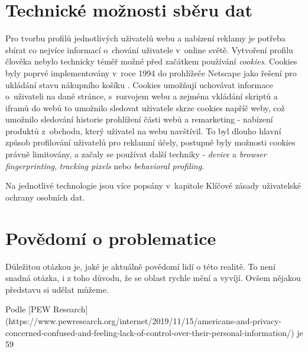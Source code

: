 
\section{Technické možnosti sběru dat}

Pro tvorbu profilů jednotlivých uživatelů webu a nabízení reklamy je potřeba sbírat co nejvíce informací o~chování uživatele v~online světě. Vytvoření profilu člověka nebylo technicky téměř možné před začátkem používání \textit{cookies}.
Cookies byly poprvé implementovány v~roce 1994 do prohlížeče Netscape jako řešení pro ukládání stavu nákupního košíku \citep{cookies-history}. Cookies umožňují uchovávat informace o~uživateli na dané stránce, s~rozvojem webu a zejména vkládání skriptů a iframů do webů to umožnilo sledovat uživatele skrze cookies napříč weby, což umožnilo sledování historie prohlížení části webů a remarketing - nabízení produktů z~obchodu, který uživatel na webu navštívil\citep{scott-cookies}. To byl dlouho hlavní způsob profilování uživatelů pro reklamní účely, postupně byly možnosti cookies právně limitovány, a začaly se používat další techniky - \textit{device} a \textit{browser fingerprinting}, \textit{tracking pixels} nebo \textit{behavioral profiling}.

Na jednotlivé technologie jsou více popsány v~kapitole Klíčové zásady uživatelské ochrany osobních dat.

\section{Povědomí o problematice}

Důležitou otázkou je, jaké je aktuálně povědomí lidí o této realitě. To není snadná otázka, i z toho důvodu, že se oblast rychle mění a vyvíjí. Ovšem nějakou představu si udělat můžeme.

Podle [PEW Research](https://www.pewresearch.org/internet/2019/11/15/americans-and-privacy-concerned-confused-and-feeling-lack-of-control-over-their-personal-information/) je 59%

